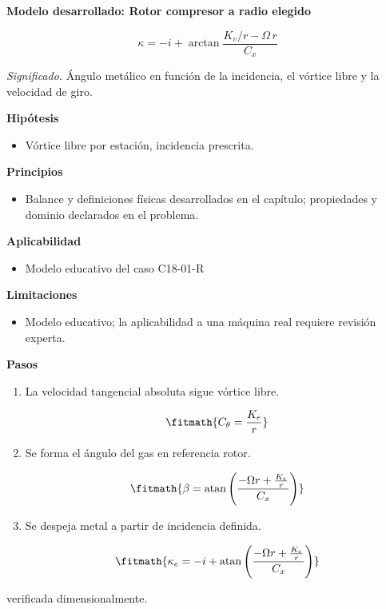 \documentclass[10pt,openany]{book}
\begin{document}
\begin{tcolorbox}[title={Desarrollos del modelo}, studiumdef, breakable]

\noindent\textbf{Modelo desarrollado: Rotor compresor a radio elegido}

\begin{equation}
\kappa=-i+\arctan\frac{K_v/r-\Omega\,r}{C_x}
\label{eq:EC-C18}
\end{equation}

\noindent\textit{Significado.} Ángulo metálico en función de la incidencia, el vórtice libre y la velocidad de giro.

\noindent\textbf{Hipótesis}
\begin{itemize}
\item Vórtice libre por estación, incidencia prescrita.
\end{itemize}

\noindent\textbf{Principios}
\begin{itemize}
\item Balance y definiciones físicas desarrollados en el capítulo; propiedades y dominio declarados en el problema.
\end{itemize}

\noindent\textbf{Aplicabilidad}
\begin{itemize}
\item Modelo educativo del caso C18-01-R
\end{itemize}

\noindent\textbf{Limitaciones}
\begin{itemize}
\item Modelo educativo; la aplicabilidad a una máquina real requiere revisión experta.
\end{itemize}

\noindent\textbf{Pasos}
\begin{enumerate}
\item
La velocidad tangencial absoluta sigue vórtice libre.

\[
\fitmath{C_\theta=\frac{K_e}{r}}
\]
\item
Se forma el ángulo del gas en referencia rotor.

\[
\fitmath{\beta=\operatorname{atan}{\left(\frac{- \Omega r + \frac{K_e}{r}}{C_x} \right)}}
\]
\item
Se despeja metal a partir de incidencia definida.

\[
\fitmath{\kappa_e=- i + \operatorname{atan}{\left(\frac{- \Omega r + \frac{K_e}{r}}{C_x} \right)}}
\]
\end{enumerate}

{\noindent\footnotesize verificada dimensionalmente.\par}
\end{tcolorbox}
\end{document}
